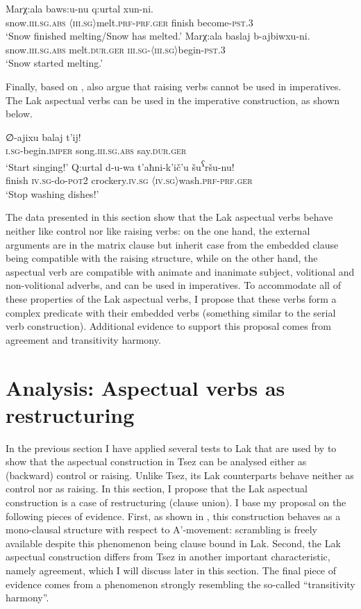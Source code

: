 \documentclass[output=paper]{langscibook}
\begin{document}
\ea\label{Rad44}
\gll Marχ:ala baws:u-nu q:urtal xun-ni.\\
snow.\textsc{iii.sg.abs} \textsc{〈iii.sg〉}melt.\textsc{prf-prf.ger} finish become-\textsc{pst.3}\\
\glt ‘Snow finished melting/Snow has melted.’
\ex\label{Rad45}
\gll Marχ:ala baslaj b-ajbiwxu-ni.\\
snow.\textsc{iii.sg.abs} melt.\textsc{dur.ger} \textsc{iii.sg-〈iii.sg〉}begin-\textsc{pst.3}\\
\glt ‘Snow started melting.’
\z 

Finally, based on \citet{Farkas1988}, \cite{PolinskyPotsdam2002} also argue that raising verbs cannot be used in imperatives. The Lak aspectual verbs can be used in the imperative construction, as shown below.

\ea\label{Rad46}
\gll ∅-ajixu balaj t’ij!\\
\textsc{i.sg}-begin.\textsc{imper} song.\textsc{iii.sg.abs} say.\textsc{dur.ger}\\
\glt ‘Start singing!’
\ex\label{Rad47}
\gll Q:urtal d-u-wa t’aħni-k’ič’u šu\textsuperscript{ʕ}ršu-nu!\\
finish \textsc{iv.sg}-do-\textsc{pot2}	crockery.\textsc{iv.sg}	\textsc{〈iv.sg〉}wash.\textsc{prf-prf.ger}\\
\glt ‘Stop washing dishes!’
\z 

The data presented in this section show that the Lak aspectual verbs behave neither like control nor like raising verbs: on the one hand, the external arguments are in the matrix clause but inherit case from the embedded clause being compatible with the raising structure, while on the other hand, the aspectual verb are compatible with animate and inanimate subject, volitional and non-volitional adverbs, and can be used in imperatives. To accommodate all of these properties of the Lak aspectual verbs, I propose that these verbs form a complex predicate with their embedded verbs (something similar to the serial verb construction). Additional evidence to support this proposal comes from agreement and transitivity harmony.

\section{Analysis: Aspectual verbs as restructuring}\largerpage
In the previous section I have applied several tests to Lak that are used by \citet{PolinskyPotsdam2002} to show that the aspectual construction in Tsez can be analysed either as (backward) control or raising. Unlike Tsez, its Lak counterparts behave neither as control nor as raising. In this section, I propose that the Lak aspectual construction is a case of restructuring (clause union). I base my proposal on the following pieces of evidence. First, as shown in , this construction behaves as a mono-clausal structure with respect to A'-movement: scrambling is freely available despite this phenomenon being clause bound in Lak. Second, the Lak aspectual construction differs from Tsez in another important characteristic, namely agreement, which I will discuss later in this section. The final piece of evidence comes from a phenomenon strongly resembling the so-called ``transitivity harmony''.
\end{document}
